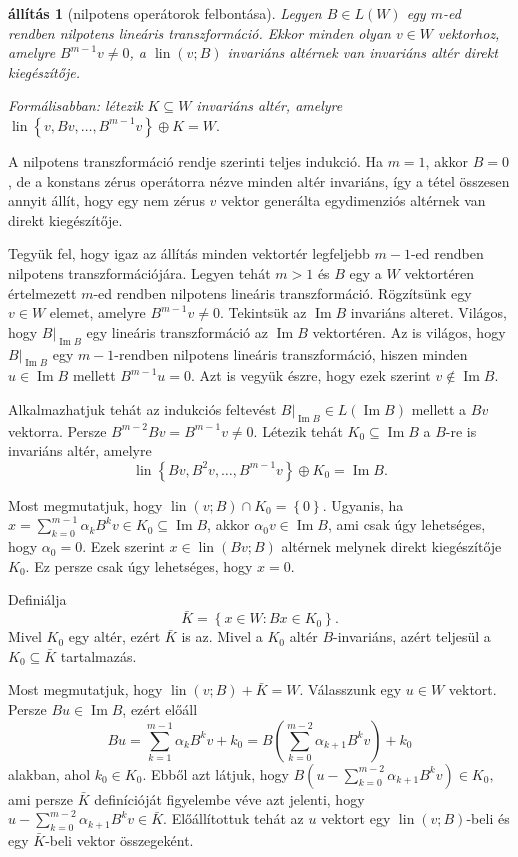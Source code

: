 \documentclass[a4paper, showtrims]{memoir}
\makeatletter
\renewenvironment{proof}[1][\proofname]
    {\par\pushQED{\qed}%
    \normalfont \topsep6\p@\@plus6\p@\relax
    \trivlist
    \item[\hskip\labelsep
        \itshape
    #1\@addpunct{:}]\ignorespaces}
    {\popQED\endtrivlist\@endpefalse}
\theoremstyle{plain}
\newtheorem{proposition}{állítás}[chapter]
\theoremstyle{remark}
\theoremstyle{definition}
\DeclareMathOperator{\lin}{lin}
\DeclareMathOperator{\im}{Im}
\makeatother
\begin{document}
\begin{proposition}[nilpotens operátorok felbontása]
	Legyen $B\in L\left( W \right)$ egy $m$-ed rendben nilpotens lineáris transzformáció.
	Ekkor minden olyan $v\in W$ vektorhoz,
	amelyre $B^{m-1}v\neq 0$, a $\lin(v;B)$ invariáns altérnek van invariáns altér
	direkt kiegészítője.

	Formálisabban: létezik $K\subseteq W$ invariáns altér, amelyre
	\(
	\lin\left\{ v,Bv,\ldots,B^{m-1}v \right\}\oplus K = W.
	\)
	\label{pr:nilpfelb}
\end{proposition}
\begin{proof}
	A nilpotens transzformáció rendje szerinti teljes indukció.
	Ha $m=1$, akkor $B=0$, de a konstans zérus operátorra nézve minden altér invariáns,
	így a tétel összesen annyit állít, hogy egy nem zérus $v$ vektor generálta egydimenziós altérnek van direkt kiegészítője.

	Tegyük fel, hogy igaz az állítás minden vektortér legfeljebb $m-1$-ed rendben nilpotens transzformációjára.
	Legyen tehát $m>1$ és $B$ egy a $W$ vektortéren értelmezett $m$-ed rendben nilpotens lineáris transzformáció.
	Rögzítsünk egy $v\in W$ elemet, amelyre $B^{m-1}v\neq 0$.
	Tekintsük az $\im B$ invariáns alteret.
	Világos, hogy $B|_{\im B}$ egy lineáris transzformáció az $\im B$ vektortéren.
	Az is világos, hogy $B|_{\im B}$ egy $m-1$-rendben nilpotens lineáris transzformáció, hiszen
	minden $u\in\im B$ mellett $B^{m-1}u=0$.
	Azt is vegyük észre, hogy ezek szerint $v\notin\im B$.

	Alkalmazhatjuk tehát az indukciós feltevést $B|_{\im B}\in L\left( \im B \right)$ mellett a
	$Bv$ vektorra.
	Persze $B^{m-2}Bv=B^{m-1}v\neq 0$.
	Létezik tehát $K_0\subseteq\im B$ a $B$-re is invariáns altér, amelyre
	\[
		\lin\left\{ Bv,B^2v,\ldots,B^{m-1}v \right\}\oplus K_0 = \im B.
	\]

	Most megmutatjuk, hogy $\lin(v;B)\cap K_0=\left\{ 0 \right\}.$
	Ugyanis, ha
	$
		x=\sum_{k=0}^{m-1}\alpha_kB^kv\in K_0\subseteq\im B
	$, akkor $\alpha_0v\in\im B$,
	ami csak úgy lehetséges, hogy $\alpha_0=0$.
	Ezek szerint $x\in\lin(Bv;B)$ altérnek melynek direkt kiegészítője $K_0$.
	Ez persze csak úgy lehetséges, hogy $x=0$.

	Definiálja
	\[
		\bar{K}=\left\{ x\in W:Bx\in K_0 \right\}.
	\]
	Mivel $K_0$ egy altér, ezért $\bar{K}$ is az.
	Mivel a $K_0$ altér $B$-invariáns, azért teljesül a $K_0\subseteq \bar{K}$ tartalmazás.

	Most megmutatjuk, hogy $\lin(v;B)+\bar{K}=W$.
	Válasszunk egy $u\in W$ vektort.
	Persze $Bu\in\im B$, ezért előáll
	\[
		Bu
		=
		\sum_{k=1}^{m-1}\alpha_kB^kv +k_0
		=
		B\left(
		\sum_{k=0}^{m-2}\alpha_{k+1}B^kv
		\right)
		+ k_0
	\]
	alakban, ahol $k_0\in K_0$.
	Ebből azt látjuk, hogy
	$
		B
		\left(
		u-
		\sum_{k=0}^{m-2}\alpha_{k+1}B^kv
		\right)
		\in
		K_0,
	$
	ami persze $\bar{K}$ definícióját figyelembe véve azt jelenti, hogy
	\(
	u-
	\sum_{k=0}^{m-2}\alpha_{k+1}B^kv
	\in
	\bar{K}.
	\)
	Előállítottuk tehát az $u$ vektort egy $\lin(v;B)$-beli és egy
	$\bar{K}$-beli vektor összegeként.


\end{proof}
\end{document}
